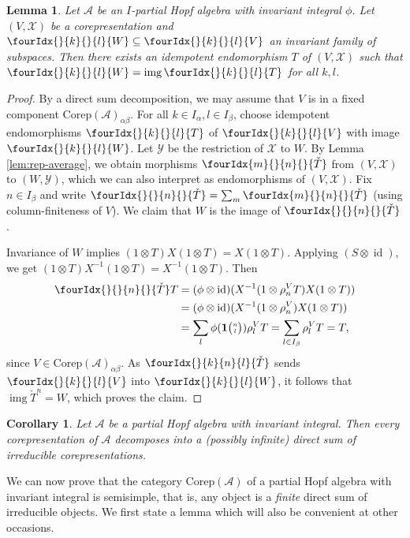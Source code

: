 \documentclass[10pt]{article}
\DeclareMathOperator{\id}{id}
\DeclareMathOperator{\img}{img}
\newcommand{\Corep}{\mathrm{Corep}}
\newcommand{\Grt}[3]{#1{\tiny {\begin{pmatrix} #2\\#3\end{pmatrix}}}}
\newcommand{\UnitC}[2]{\Grt{\mathbf{1}}{#1}{#2}}
\newcommand{\Gr}[5]{\fourIdx{#2}{#4}{#3}{#5}{#1}}%
\newcommand{\Gru}[3]{\Gr{#1}{}{}{#2}{#3}}
\newcommand{\Grd}[3]{\Gr{#1}{#2}{#3}{}{}}
\newtheorem{Lem}[Theorem]{Lemma}
\newtheorem{Cor}[Theorem]{Corollary}
\theoremstyle{definition}
\numberwithin{equation}{section}
\begin{document}
\begin{Lem}
  Let $\mathscr{A}$ be an $I$-partial Hopf algebra with invariant integral $\phi$.
  Let $(V,\mathscr{X})$ be a corepresentation
  and $\Gru{W}{k}{l} \subseteq \Gru{V}{k}{l}$ an invariant family of
  subspaces. Then there exists an idempotent endomorphism $T$ of
  $(V,\mathscr{X})$ such that $\Gru{W}{k}{l}=\img\Gru{T}{k}{l}$ for
  all $k,l$.
\end{Lem}
\begin{proof}
By a direct sum decomposition, we may assume that $V$ is in a fixed component $\Corep(\mathscr{A})_{\alpha\beta}$. For all $k\in I_{\alpha},l\in I_{\beta}$, choose idempotent endomorphisms $\Gru{T}{k}{l}$ of $\Gru{V}{k}{l}$
  with image $\Gru{W}{k}{l}$. Let $\mathscr{Y}$ be the restriction of $\mathscr{X}$ to $W$. By Lemma \ref{lem:rep-average}, we obtain
  morphisms $\Grd{\check{T}}{m}{n}$ from $(V,\mathscr{X})$ to $(W,\mathscr{Y})$, which we can also interpret as endomorphisms of $(V,\mathscr{X})$. Fix $n\in I_{\beta}$ and write $\Grd{\check{T}}{}{n} = \sum_m \Grd{\check{T}}{m}{n}$ (using column-finiteness of $V$). We claim that $W$ is the image of $\Grd{\check{T}}{}{n}$.
  
   Invariance of $W$ implies  $(1 \otimes T)X(1
  \otimes T)=X(1\otimes T)$. Applying
 $(S \otimes \id)$, we get   $(1 \otimes T)X^{-1}(1
  \otimes T)=X^{-1}(1\otimes T)$. Then
  \begin{align*}
    \Grd{\check{T}}{}{n} T &= (\phi \otimes \id)(X^{-1}(1 \otimes
    \rho_{n}^{V}T)X(1 \otimes T))  \\ &= 
     (\phi \otimes \id)(X^{-1}(1 \otimes
    \rho_{n}^{V})X(1 \otimes T)) \\&
    =
  \sum_l \phi(\UnitC{n}{l}) \rho^{V}_{l}T  = \sum_{l\in I_{\beta}} \rho^V_lT = T,
  \end{align*}
 since $V\in \Corep(\mathscr{A})_{\alpha\beta}$. As $\Gr{\check{T}}{}{n}{k}{l}$ sends $\Gru{V}{k}{l}$ into $\Gru{W}{k}{l}$, it follows that $\img{\check{T}^{n}}=W$, which proves the claim.
\end{proof}

\begin{Cor}  \label{cor:rep-cosemisimple}
  Let $\mathscr{A}$ be a partial Hopf algebra with invariant integral.  Then
  every corepresentation of $\mathscr{A}$ decomposes into a (possibly infinite) direct
  sum of irreducible corepresentations.
\end{Cor} 

We can now prove that the category $\Corep(\mathscr{A})$ of a partial Hopf algebra with invariant integral is semisimple, that is, any object is a \emph{finite} direct sum of irreducible objects. We first state a lemma which will also be convenient at other occasions.
\end{document}
